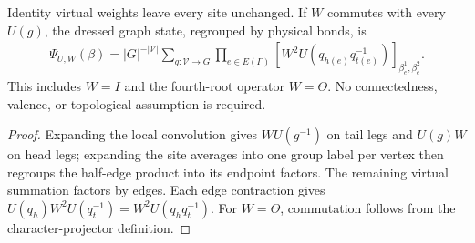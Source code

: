 \begin{lemma}%
    \label{thm:peps_graph_weighted_averaging_coherent}
    \leanok
    Identity virtual weights leave every site unchanged. If $W$ commutes with
    every $U(g)$, the dressed graph state, regrouped by physical bonds, is
    \begin{align}
        \Psi_{U,W}(\beta)=|G|^{-|\mathcal V|}
        \sum_{q:\mathcal V\to G}\prod_{e\in E(\Gamma)}
        [W^2U(q_{h(e)}q_{t(e)}^{-1})]_{\beta_e^1,\beta_e^2}.
    \end{align}
    This includes $W=I$ and the fourth-root operator $W=\Theta$.
    No connectedness, valence, or topological assumption is required.
\end{lemma}
\begin{proof}\leanok
    Expanding the local convolution gives $WU(g^{-1})$ on tail legs and
    $U(g)W$ on head legs; expanding the site averages into one group label per
    vertex then regroups the half-edge product into its endpoint factors.
    The remaining virtual summation factors by edges. Each edge contraction
    gives $U(q_h)W^2U(q_t^{-1})=W^2U(q_hq_t^{-1})$.
    For $W=\Theta$, commutation follows from the character-projector definition.
\end{proof}

